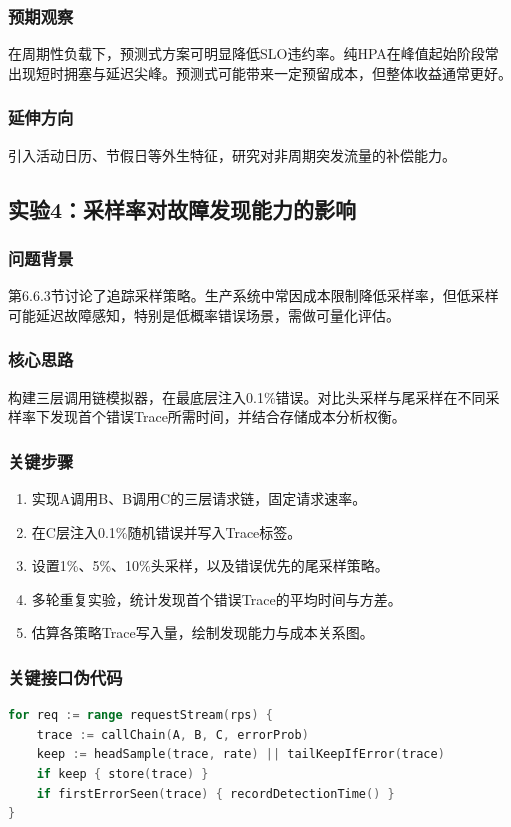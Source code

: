 \subsubsection{预期观察}
在周期性负载下，预测式方案可明显降低SLO违约率。纯HPA在峰值起始阶段常出现短时拥塞与延迟尖峰。预测式可能带来一定预留成本，但整体收益通常更好。

\subsubsection{延伸方向}
引入活动日历、节假日等外生特征，研究对非周期突发流量的补偿能力。

\subsection{实验4：采样率对故障发现能力的影响}

\subsubsection{问题背景}
第6.6.3节讨论了追踪采样策略。生产系统中常因成本限制降低采样率，但低采样可能延迟故障感知，特别是低概率错误场景，需做可量化评估。

\subsubsection{核心思路}
构建三层调用链模拟器，在最底层注入0.1\%错误。对比头采样与尾采样在不同采样率下发现首个错误Trace所需时间，并结合存储成本分析权衡。

\subsubsection{关键步骤}
\begin{enumerate}
\item 实现A调用B、B调用C的三层请求链，固定请求速率。
\item 在C层注入0.1\%随机错误并写入Trace标签。
\item 设置1\%、5\%、10\%头采样，以及错误优先的尾采样策略。
\item 多轮重复实验，统计发现首个错误Trace的平均时间与方差。
\item 估算各策略Trace写入量，绘制发现能力与成本关系图。
\end{enumerate}

\subsubsection{关键接口伪代码}
\begin{tcolorbox}[title=采样策略对比模拟器]
\begin{lstlisting}[style=codeblock, language=go]
for req := range requestStream(rps) {
    trace := callChain(A, B, C, errorProb)
    keep := headSample(trace, rate) || tailKeepIfError(trace)
    if keep { store(trace) }
    if firstErrorSeen(trace) { recordDetectionTime() }
}
\end{lstlisting}
\end{tcolorbox}

